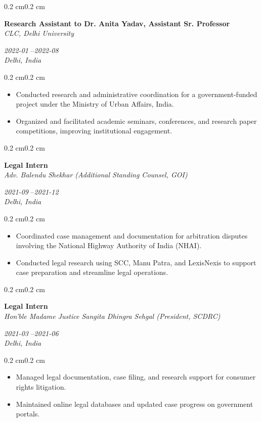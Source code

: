 \documentclass[10pt, letterpaper]{article}
\newenvironment{highlights}{%
    \begin{itemize}[
        topsep=0.10 cm,%
        parsep=0.10 cm,%
        partopsep=0pt,%
        itemsep=0pt,%
        leftmargin=0.4 cm + 10pt%
    ]
}{%
    \end{itemize}%
}
\newenvironment{onecolentry}{%
    \begin{adjustwidth}{0.2 cm}{0.2 cm}%
}{%
    \end{adjustwidth}%
}
\newenvironment{twocolentry}[1]{%
    \begin{onecolentry}%
    \def\twocolentryarg{#1}%
    \noindent
    \begin{minipage}[t]{0.68\textwidth} %
}{%
    \end{minipage}\hfill%
    \begin{minipage}[t]{0.30\textwidth} %
      \raggedleft\twocolentryarg
    \end{minipage}%
    \vspace{0.2cm}%
    \end{onecolentry}%
}
\begin{document}
\vspace{0.2 cm}
\begin{twocolentry}{%
\textit{2022-01 }--\textit{2022-08} \\[0.1cm]
\textit{Delhi, India}%
}
    \textbf{Research Assistant to Dr. Anita Yadav, Assistant Sr. Professor }\\
    \textit{CLC, Delhi University }
\end{twocolentry}
\vspace{0.10 cm}
\begin{onecolentry}
    \begin{highlights}
        \item Conducted research and administrative coordination for a government-funded project under the Ministry of Urban Affairs, India.
        \item Organized and facilitated academic seminars, conferences, and research paper competitions, improving institutional engagement.
    \end{highlights}
\end{onecolentry}
\vspace{0.2 cm}
\begin{twocolentry}{%
\textit{2021-09 }--\textit{2021-12} \\[0.1cm]
\textit{Delhi, India}%
}
    \textbf{Legal Intern }\\
    \textit{Adv. Balendu Shekhar (Additional Standing Counsel, GOI) }
\end{twocolentry}
\vspace{0.10 cm}
\begin{onecolentry}
    \begin{highlights}
        \item Coordinated case management and documentation for arbitration disputes involving the National Highway Authority of India (NHAI).
        \item Conducted legal research using SCC, Manu Patra, and LexisNexis to support case preparation and streamline legal operations.
    \end{highlights}
\end{onecolentry}
\vspace{0.2 cm}
\begin{twocolentry}{%
\textit{2021-03 }--\textit{2021-06} \\[0.1cm]
\textit{Delhi, India}%
}
    \textbf{Legal Intern }\\
    \textit{Hon’ble Madame Justice Sangita Dhingra Sehgal (President, SCDRC) }
\end{twocolentry}
\vspace{0.10 cm}
\begin{onecolentry}
    \begin{highlights}
        \item Managed legal documentation, case filing, and research support for consumer rights litigation.
        \item Maintained online legal databases and updated case progress on government portals.
    \end{highlights}
\end{onecolentry}
\vspace{0.2 cm}
\end{document}
